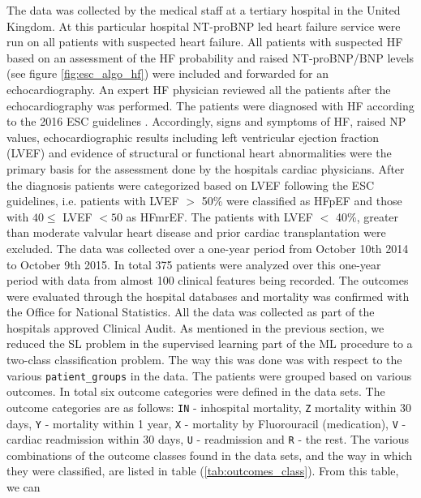 \documentclass[../thesis.tex]{subfiles}
\begin{document}
\indent The data was collected by the medical staff at a tertiary hospital in the United Kingdom. At this particular hospital NT-proBNP led heart failure service were run on all patients with suspected heart failure. All patients with suspected HF based on an assessment of the HF probability and raised NT-proBNP/BNP levels (see figure \ref{fig:esc_algo_hf}) were included and forwarded for an echocardiography. An expert HF physician reviewed all the patients after the echocardiography was performed. The patients were diagnosed with HF according to the 2016 ESC guidelines \citep{ponikowski2016}. Accordingly, signs and symptoms of HF, raised NP values, echocardiographic results including left ventricular ejection fraction (LVEF) and evidence of structural or functional heart abnormalities were the primary basis for the assessment done by the hospitals cardiac physicians. After the diagnosis patients were categorized based on LVEF following the ESC guidelines, i.e. patients with LVEF $>$ 50\% were classified as HFpEF and those with $40 \leq$ LVEF $< 50$ as HFmrEF. The patients with LVEF $<$ 40\%, greater than moderate valvular heart disease and prior cardiac transplantation were excluded. The data was collected over a one-year period from October 10th 2014 to October 9th 2015. In total 375 patients were analyzed over this one-year period with data from almost 100 clinical features being recorded. The outcomes were evaluated through the hospital databases and mortality was confirmed with the Office for National Statistics. All the data was collected as part of the hospitals approved Clinical Audit. As mentioned in the previous section, we reduced the SL problem in the supervised learning part of the ML procedure to a two-class classification problem. The way this was done was with respect to the various \texttt{patient\_groups} in the data. The patients were grouped based on various \noindent outcomes. In total six outcome categories were  defined in the data sets. The outcome categories are as follows: \texttt{IN} - inhospital mortality, \texttt{Z} \noindent mortality within 30 days, \texttt{Y} - mortality within 1 year, \texttt{X} - mortality by Fluorouracil (medication), \texttt{V} - cardiac readmission within 30 days, \texttt{U} - readmission and \texttt{R} - the rest. The various combinations of the outcome classes found in the data sets, and the way in which they were classified, are listed in table (\ref{tab:outcomes_class}). From this table, we can\\


\end{document}

